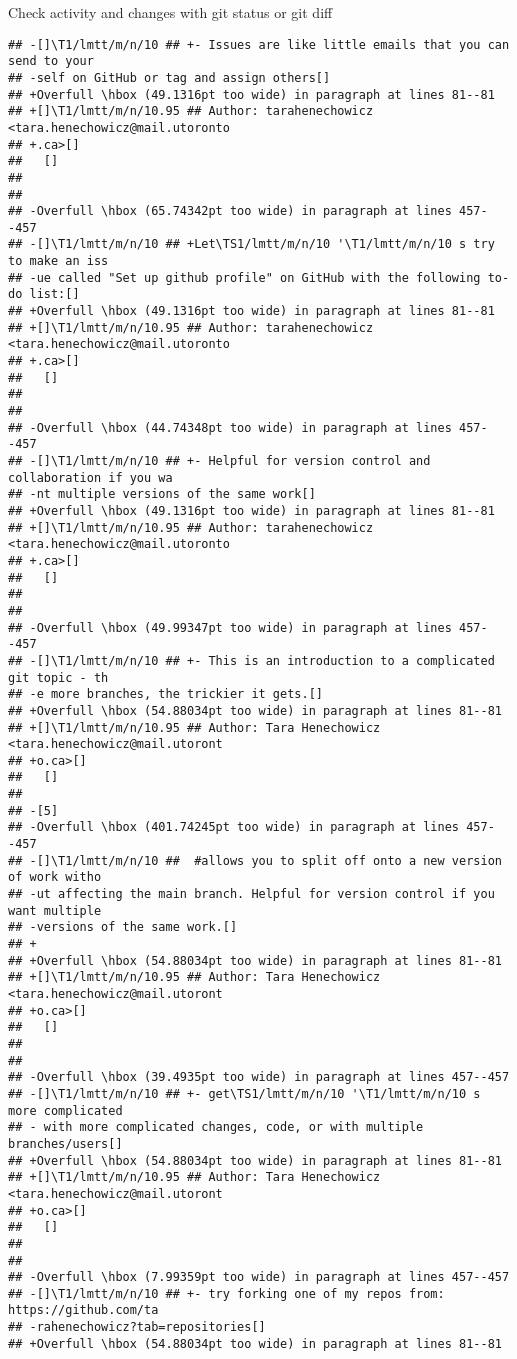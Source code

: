 \documentclass[ignorenonframetext,]{beamer}
\begin{document}
\begin{frame}[fragile]{Check activity and changes with git status or git
diff}
\begin{verbatim}
## -[]\T1/lmtt/m/n/10 ## +- Issues are like little emails that you can send to your
## -self on GitHub or tag and assign others[] 
## +Overfull \hbox (49.1316pt too wide) in paragraph at lines 81--81
## +[]\T1/lmtt/m/n/10.95 ## Author: tarahenechowicz <tara.henechowicz@mail.utoronto
## +.ca>[] 
##   []
##  
##  
## -Overfull \hbox (65.74342pt too wide) in paragraph at lines 457--457
## -[]\T1/lmtt/m/n/10 ## +Let\TS1/lmtt/m/n/10 '\T1/lmtt/m/n/10 s try to make an iss
## -ue called "Set up github profile" on GitHub with the following to-do list:[] 
## +Overfull \hbox (49.1316pt too wide) in paragraph at lines 81--81
## +[]\T1/lmtt/m/n/10.95 ## Author: tarahenechowicz <tara.henechowicz@mail.utoronto
## +.ca>[] 
##   []
##  
##  
## -Overfull \hbox (44.74348pt too wide) in paragraph at lines 457--457
## -[]\T1/lmtt/m/n/10 ## +- Helpful for version control and collaboration if you wa
## -nt multiple versions of the same work[] 
## +Overfull \hbox (49.1316pt too wide) in paragraph at lines 81--81
## +[]\T1/lmtt/m/n/10.95 ## Author: tarahenechowicz <tara.henechowicz@mail.utoronto
## +.ca>[] 
##   []
##  
##  
## -Overfull \hbox (49.99347pt too wide) in paragraph at lines 457--457
## -[]\T1/lmtt/m/n/10 ## +- This is an introduction to a complicated git topic - th
## -e more branches, the trickier it gets.[] 
## +Overfull \hbox (54.88034pt too wide) in paragraph at lines 81--81
## +[]\T1/lmtt/m/n/10.95 ## Author: Tara Henechowicz <tara.henechowicz@mail.utoront
## +o.ca>[] 
##   []
##  
## -[5]
## -Overfull \hbox (401.74245pt too wide) in paragraph at lines 457--457
## -[]\T1/lmtt/m/n/10 ##  #allows you to split off onto a new version of work witho
## -ut affecting the main branch. Helpful for version control if you want multiple 
## -versions of the same work.[] 
## +
## +Overfull \hbox (54.88034pt too wide) in paragraph at lines 81--81
## +[]\T1/lmtt/m/n/10.95 ## Author: Tara Henechowicz <tara.henechowicz@mail.utoront
## +o.ca>[] 
##   []
##  
##  
## -Overfull \hbox (39.4935pt too wide) in paragraph at lines 457--457
## -[]\T1/lmtt/m/n/10 ## +- get\TS1/lmtt/m/n/10 '\T1/lmtt/m/n/10 s more complicated
## - with more complicated changes, code, or with multiple branches/users[] 
## +Overfull \hbox (54.88034pt too wide) in paragraph at lines 81--81
## +[]\T1/lmtt/m/n/10.95 ## Author: Tara Henechowicz <tara.henechowicz@mail.utoront
## +o.ca>[] 
##   []
##  
##  
## -Overfull \hbox (7.99359pt too wide) in paragraph at lines 457--457
## -[]\T1/lmtt/m/n/10 ## +- try forking one of my repos from: https://github.com/ta
## -rahenechowicz?tab=repositories[] 
## +Overfull \hbox (54.88034pt too wide) in paragraph at lines 81--81

\end{verbatim}
\end{frame}
\end{document}
